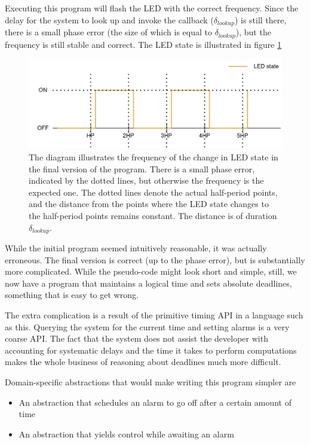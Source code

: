 Executing this program will flash the LED with the correct frequency. Since the delay for the system to look up and
invoke the callback ($\delta_{lookup}$) is still there, there is a small phase error (the size of which is equal to
$\delta_{lookup}$), but the frequency is still stable and correct. The LED state is illustrated in figure \ref{graphics:phase-error}

\begin{figure}
    \centering
    \includegraphics[scale=0.2]{graphics/phase-error.png}
    \caption{The diagram illustrates the frequency of the change in LED state in the final version of the program.
    There is a small phase error, indicated by the dotted lines, but otherwise the frequency is the expected one.
    The dotted lines denote the actual half-period points, and the distance from the points where the LED state
    changes to the half-period points remains constant. The distance is of duration $\delta_{lookup}$.}
    \label{graphics:phase-error}
\end{figure}

While the initial program seemed intuitively reasonable, it was actually erroneous. The final version is
correct (up to the phase error), but is substantially more complicated. While the pseudo-code might look short and
simple, still, we now have a program that maintains a logical time and sets absolute deadlines, something that is easy
to get wrong.

The extra complication is a result of the primitive timing API in a language such as this. Querying the system for the current
time and setting alarms is a very coarse API. The fact that the system does not assist the developer with accounting for
systematic delays and the time it takes to perform computations makes the whole business of reasoning about deadlines much more difficult.

Domain-specific abstractions that would make writing this program simpler are
\begin{itemize}
    \item An abstraction that schedules an alarm to go off after a certain amount of time
    \item An abstraction that yields control while awaiting an alarm
\end{itemize}

